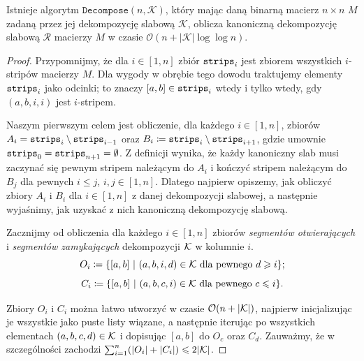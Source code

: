 \documentclass[runningheads]{llncs}
\newcommand{\Oh}{\mathcal{O}}
\renewcommand{\leq}{\leqslant}
\renewcommand{\geq}{\geqslant}
\begin{document}
\begin{theorem}\label{thm:canonical}
Istnieje algorytm $\mathtt{Decompose}(n,\mathcal{K})$, który
mając daną
binarną macierz $n \times n$ $M$ zadaną przez jej dekompozycję slabową
$\mathcal{K}$, oblicza kanoniczną dekompozycję slabową $\mathcal{R}$ macierzy
$M$ w czasie $\Oh(n+|\mathcal{K}|\log \log n)$.
\end{theorem}
\begin{proof}
	Przypomnijmy, że dla $i\in [1,n]$ zbiór $\mathtt{strips}_i$ jest zbiorem wszystkich $i$-stripów macierzy $M$. Dla wygody w obrębie tego dowodu traktujemy elementy $\mathtt{strips}_i$ jako odcinki; to znaczy $[a,b]\in \mathtt{strips}_i$ wtedy i tylko wtedy, gdy $(a,b,i,i)$ jest $i$-stripem.
	
	Naszym pierwszym celem jest obliczenie, dla każdego $i\in [1,n]$, zbiorów
	$A_i=\mathtt{strips}_i\setminus \mathtt{strips}_{i-1}$ oraz $B_i\coloneqq \mathtt{strips}_i\setminus \mathtt{strips}_{i+1}$,
	gdzie umownie $\mathtt{strips}_0 = \mathtt{strips}_{n+1}=\emptyset$. 
	Z definicji wynika, że każdy kanoniczny slab musi zaczynać się pewnym stripem należącym do $A_i$ i kończyć stripem należącym do $B_j$ dla pewnych $i\leq j$, $i,j\in [1,n]$. 
	Dlatego najpierw opiszemy, jak obliczyć zbiory $A_i$ i $B_i$ dla $i \in [1, n]$ z danej dekompozycji slabowej, a następnie wyjaśnimy, jak uzyskać z nich kanoniczną dekompozycję slabową.
	
	Zacznijmy od obliczenia dla każdego $i\in [1,n]$ zbiorów {\em{segmentów otwierających}} i {\em{segmentów zamykających}} dekompozycji $\cal K$ w kolumnie $i$. 
	\[O_i\coloneqq \{[a,b]~|~(a,b,i,d)\in {\cal K} \textrm{ dla pewnego $d\geq i$}\};\] \[C_i\coloneqq \{[a,b]~|~(a,b,c,i)\in {\cal K} \textrm{ dla pewnego $c\leq i$}\}.\]
	
	Zbiory $O_i$ i $C_i$ można łatwo utworzyć w czasie $\Oh(n + |\cal K|)$, najpierw inicjalizując je wszystkie jako puste listy wiązane, a następnie iterując po wszystkich elementach $(a, b, c, d) \in \cal K$ i dopisując $[a, b]$ do $O_c$ oraz $C_d$. Zauważmy, że w szczególności zachodzi $\sum_{i=1}^n (|O_i|+|C_i|)\leq 2|\cal K|$.
	

\end{proof}
\end{document}

